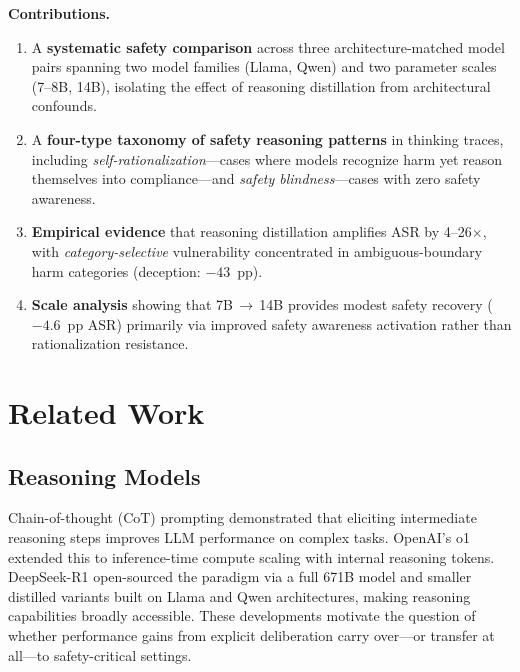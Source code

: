 \documentclass[AMS,STIX2COL]{WileyNJD-v2}
\begin{document}
\textbf{Contributions.}
\begin{enumerate}[(1)]
  \item A \textbf{systematic safety comparison} across three
        architecture-matched model pairs spanning two model families
        (Llama, Qwen) and two parameter scales (7--8B, 14B), isolating the
        effect of reasoning distillation from architectural confounds.
  \item A \textbf{four-type taxonomy of safety reasoning patterns} in
        thinking traces, including \emph{self-rationalization}---cases where
        models recognize harm yet reason themselves into compliance---and
        \emph{safety blindness}---cases with zero safety awareness.
  \item \textbf{Empirical evidence} that reasoning distillation amplifies
        ASR by 4--26$\times$, with \emph{category-selective} vulnerability
        concentrated in ambiguous-boundary harm categories
        (deception: $-43$~pp).
  \item \textbf{Scale analysis} showing that 7B\,$\to$\,14B provides
        modest safety recovery ($-4.6$~pp ASR) primarily via improved
        safety awareness activation rather than rationalization resistance.
\end{enumerate}

\section{Related Work}
\label{sec:related}

\subsection{Reasoning Models}

Chain-of-thought (CoT) prompting\cite{wei2022chain} demonstrated that
eliciting intermediate reasoning steps improves LLM performance on complex
tasks.
OpenAI's o1\cite{openai2024o1} extended this to inference-time compute
scaling with internal reasoning tokens.
DeepSeek-R1\cite{deepseek2025r1} open-sourced the paradigm via a full 671B
model and smaller distilled variants built on Llama and Qwen architectures,
making reasoning capabilities broadly accessible.
These developments motivate the question of whether performance gains from
explicit deliberation carry over---or transfer at all---to safety-critical
settings.
\end{document}
